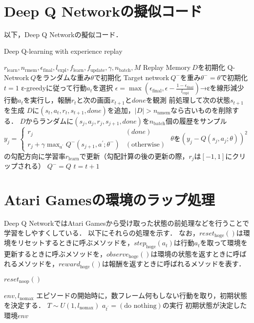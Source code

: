 \documentclass{jarticle}
\begin{document}
\section{Deep Q Networkの擬似コード}
以下，Deep Q Networkの擬似コード．
\begin{algorithm}[htb]
\caption{Deep Q-learning with experience replay}
\label{alg:dqn}                          
\begin{algorithmic}[1]   
\REQUIRE $r_{\mathrm{learn}},n_{\mathrm{rmem}},\epsilon_{\mathrm{final}},l_{\mathrm{expl}},f_{\mathrm{learn}},f_{\mathrm{update}},\gamma,n_{\mathrm{batch}}, M$
\STATE Replay Memory$~D$を初期化
\STATE Q-Network$~Q$をランダムな重み$\theta$で初期化
\STATE Target network$~Q^-$を重み$\theta^-=\theta$で初期化
\STATE $t=1$
\STATE ε-greedyに従って行動$a_t$を選択
\STATE $\epsilon=\max{(\epsilon_{\mathrm{final}},\epsilon-\frac{1-\epsilon_{\mathrm{final}}}{l_{\mathrm{expl}}})}$→εを線形減少
\STATE 行動$a_t$を実行し，報酬$r_t$と次の画面$x_{t+1}$と$done$を観測
\STATE 前処理して次の状態$s_{t+1}$を生成
\STATE $D$に$(s_t,a_t,r_t,s_{t+1},done)$を追加，$|D|>n_{\mathrm{nmem}}$なら古いものを削除する．
\STATE $D$からランダムに$(s_j,a_j,r_j,s_{j+1},done)$を$n_{\mathrm{batch}}$個の履歴をサンプル
\STATE $y_j=
\begin{cases}
r_j & (done) \\
r_j+\gamma\max_{a^{\prime}}Q^-(s_{j+1},a^{\prime};\theta^-) & (\mbox{otherwise})
\end{cases}$
\STATE $\theta$を$(y_j-Q(s_j,a_j;\theta))^2$の勾配方向に学習率$r_{\mathrm{learn}}$で更新（勾配計算の後の更新の際，$r_j$は$[-1,1]$にクリップされる）
\ENDIF
{}
\STATE $Q^-=Q$
\ENDIF
\ENDIF
\STATE $t=t+1$
\ENDWHILE
\ENDFOR
\end{algorithmic}
\end{algorithm}


\section{Atari Gamesの環境のラップ処理}
Deep Q NetworkではAtari Gamesから受け取った状態の前処理などを行うことで学習をしやすくしている．
以下にそれらの処理を示す．
なお，$reset_{\mathrm{hoge}}()$は環境をリセットするときに呼ぶメソッドを，$step_{\mathrm{hoge}}(a_t)$は行動$a_t$を取って環境を更新するときに呼ぶメソッドを，$observe_{\mathrm{hoge}}()$は環境の状態を返すときに呼ばれるメソッドを，$reward_{\mathrm{hoge}}()$は報酬を返すときに呼ばれるメソッドを表す．
\begin{algorithm}[htb]
\caption{$reset_{\mathrm{noop}}()$}
\label{alg:noop_reset}                          
\begin{algorithmic}[1]   
\REQUIRE $env, l_{\mathrm{nomax}}$
\STATE エピソードの開始時に，数フレーム何もしない行動を取り，初期状態を決定する．
\STATE $T\sim U(1,l_{\mathrm{nomax}})$
\STATE $a_{t^{\prime}}=(\mbox{do nothing})$の実行
\ENDFOR
\ENSURE 初期状態が決定した環境$env$
\end{algorithmic}
\end{algorithm}
\end{document}
